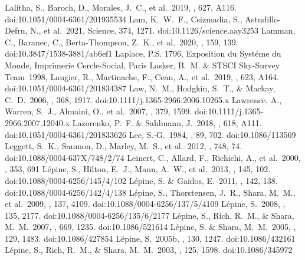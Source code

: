 \documentclass[twocolumn,tighten,twocolappendix]{aastex631}
\begin{document}
\begin{thebibliography}{}
 Lalitha, S., Baroch, D., Morales, J.~C., et al.\ 2019, \aap, 627, A116. doi:10.1051/0004-6361/201935534
 Lam, K.~W.~F., Csizmadia, S., Astudillo-Defru, N., et al.\ 2021, Science, 374, 1271. doi:10.1126/science.aay3253
 Lamman, C., Baranec, C., Berta-Thompson, Z.~K., et al.\ 2020, \aj, 159, 139. doi:10.3847/1538-3881/ab6ef1
 Laplace, P.S. 1796, Exposition du Syst{\'e}me du Monde, Imprimerie Cercle-Social, Paris
 Lasker, B.~M. \& STSCI Sky-Survey Team\ 1998, \aas
{} Laugier, R., Martinache, F., Ceau, A., et al.\ 2019, \aap, 623, A164. doi:10.1051/0004-6361/201834387
 Law, N.~M., Hodgkin, S.~T., \& Mackay, C.~D.\ 2006, \mnras, 368, 1917. doi:10.1111/j.1365-2966.2006.10265.x
 Lawrence, A., Warren, S.~J., Almaini, O., et al.\ 2007, \mnras, 379, 1599. doi:10.1111/j.1365-2966.2007.12040.x
 Lazorenko, P.~F. \& Sahlmann, J.\ 2018, \aap, 618, A111. doi:10.1051/0004-6361/201833626
 Lee, S.-G.\ 1984, \aj, 89, 702. doi:10.1086/113569
 Leggett, S.~K., Saumon, D., Marley, M.~S., et al.\ 2012, \apj, 748, 74. doi:10.1088/0004-637X/748/2/74
 Leinert, C., Allard, F., Richichi, A., et al.\ 2000, \aap, 353, 691
 L{\'e}pine, S., Hilton, E.~J., Mann, A.~W., et al.\ 2013, \aj, 145, 102. doi:10.1088/0004-6256/145/4/102
 L{\'e}pine, S. \& Gaidos, E.\ 2011, \aj, 142, 138. doi:10.1088/0004-6256/142/4/138
 L{\'e}pine, S., Thorstensen, J.~R., Shara, M.~M., et al.\ 2009, \aj, 137, 4109. doi:10.1088/0004-6256/137/5/4109
 L{\'e}pine, S.\ 2008, \aj, 135, 2177. doi:10.1088/0004-6256/135/6/2177
 L{\'e}pine, S., Rich, R.~M., \& Shara, M.~M.\ 2007, \apj, 669, 1235. doi:10.1086/521614
 L{\'e}pine, S. \& Shara, M.~M.\ 2005, \aj, 129, 1483. doi:10.1086/427854
 L{\'e}pine, S.\ 2005b, \aj, 130, 1247. doi:10.1086/432161
 L{\'e}pine, S., Rich, R.~M., \& Shara, M.~M.\ 2003, \aj, 125, 1598. doi:10.1086/345972

\end{thebibliography}
\end{document}
